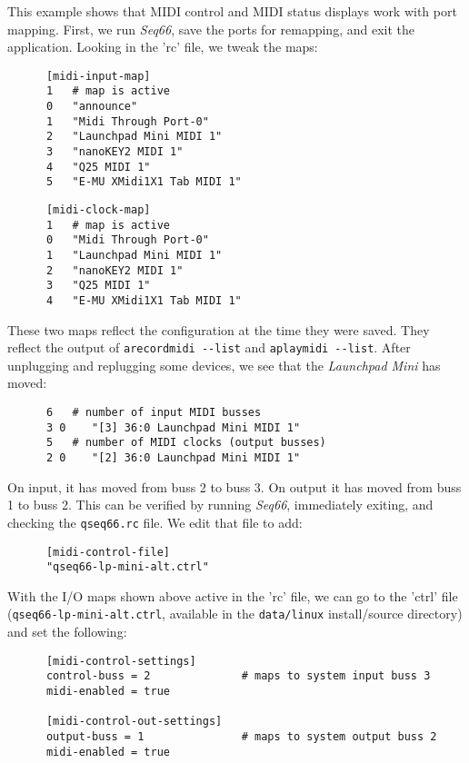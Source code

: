    This example shows that MIDI control and MIDI status displays work with
   port mapping.  First, we run \textsl{Seq66}, save the ports for
   remapping, and exit the application.  Looking in the 'rc' file, we tweak
   the maps:

   \begin{verbatim}
      [midi-input-map]
      1   # map is active
      0   "announce"
      1   "Midi Through Port-0"
      2   "Launchpad Mini MIDI 1"
      3   "nanoKEY2 MIDI 1"
      4   "Q25 MIDI 1"
      5   "E-MU XMidi1X1 Tab MIDI 1"
   \end{verbatim}

   \begin{verbatim}
      [midi-clock-map]
      1   # map is active
      0   "Midi Through Port-0"
      1   "Launchpad Mini MIDI 1"
      2   "nanoKEY2 MIDI 1"
      3   "Q25 MIDI 1"
      4   "E-MU XMidi1X1 Tab MIDI 1"
   \end{verbatim}

   These two maps reflect the configuration at the time they were saved.
   They reflect the output of \texttt{arecordmidi -{}-list} and
   \texttt{aplaymidi -{}-list}.
   After unplugging and replugging some devices, we see that the
   \textsl{Launchpad Mini} has moved:

   \begin{verbatim}
      6   # number of input MIDI busses
      3 0    "[3] 36:0 Launchpad Mini MIDI 1"
      5   # number of MIDI clocks (output busses)
      2 0    "[2] 36:0 Launchpad Mini MIDI 1"
   \end{verbatim}

   On input, it has moved from buss 2 to buss 3.
   On output it has moved from buss 1 to buss 2.
   This can be verified by running \textsl{Seq66}, immediately exiting,
   and checking the \texttt{qseq66.rc} file.
   We edit that file to add:

   \begin{verbatim}
      [midi-control-file]
      "qseq66-lp-mini-alt.ctrl"
   \end{verbatim}

   With the I/O maps shown above active in the 'rc' file,
   we can go to the 'ctrl' file (\texttt{qseq66-lp-mini-alt.ctrl}, available in
   the \texttt{data/linux} install/source directory)
   and set the following:

   \begin{verbatim}
      [midi-control-settings]
      control-buss = 2              # maps to system input buss 3
      midi-enabled = true

      [midi-control-out-settings]
      output-buss = 1               # maps to system output buss 2
      midi-enabled = true
   \end{verbatim}

